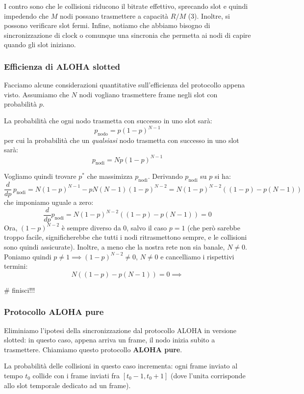 \documentclass[a4paper,11pt]{article}
\begin{document}
I contro sono che le collisioni riducono il bitrate effettivo, sprecando slot e quindi impedendo che $M$ nodi possano trasmettere a capacità $R/M$ (3). Inoltre, si possono verificare slot fermi. Infine, notiamo che abbiamo bisogno di sincronizzazione di clock o comunque una sincronia che permetta ai nodi di capire quando gli slot iniziano.

\subsubsection{Efficienza di ALOHA slotted}
Facciamo alcune considerazioni quantitative sull'efficienza del protocollo appena visto.
Assumiamo che $N$ nodi vogliano trasmettere frame negli slot con probabilità $p$.

La probabilità che ogni nodo trasmetta con successo in uno slot sarà:
$$
p_\text{nodo} = p(1 - p)^{N - 1}
$$
per cui la probabilità che un \textit{qualsiasi} nodo trasmetta con successo in uno slot sarà:
$$
p_{\text{nodi}} = N p(1 - p)^{N - 1}
$$

Vogliamo quindi trovare $p^*$ che massimizza $p_\text{nodi}$.
Derivando $p_\text{nodi}$ su $p$ si ha:
$$
\frac{d}{dp} \, p_\text{nodi} = N(1 - p)^{N - 1} - p N (N - 1) (1 - p)^{N - 2}
= N (1 - p)^{N - 2} \left( (1 - p) - p(N - 1) \right)
$$
che imponiamo uguale a zero:
$$
\frac{d}{dp} p_\text{nodi} = N (1 - p)^{N - 2} \left( (1 - p) - p(N - 1) \right) = 0
$$
Ora, $(1 - p)^{N - 2}$ è sempre diverso da 0, salvo il caso $p = 1$ (che però sarebbe troppo facile, significherebbe che tutti i nodi ritrasmettono sempre, e le collisioni sono quindi assicurate).
Inoltre, a meno che la nostra rete non sia banale, $N \neq 0$.
Poniamo quindi $p \neq 1 \implies (1 - p)^{N - 2} \neq 0$, $N \neq 0$ e cancelliamo i rispettivi termini:
$$
N \left( (1 - p) - p(N - 1) \right) = 0 \implies
$$

# finisci!!!

\subsubsection{Protocollo ALOHA pure}
Eliminiamo l'ipotesi della sincronizzazione dal protocollo ALOHA in versione slotted: in questo caso, appena arriva un frame, il nodo inizia subito a trasmettere.
Chiamiamo questo protocollo \textbf{ALOHA pure}.

La probabilità delle collisioni in questo caso incrementa: ogni frame inviato al tempo $t_0$ collide con i frame inviati fra $[t_0 - 1, t_0 + 1]$ (dove l'unita corrisponde allo slot temporale dedicato ad un frame).
\end{document}
